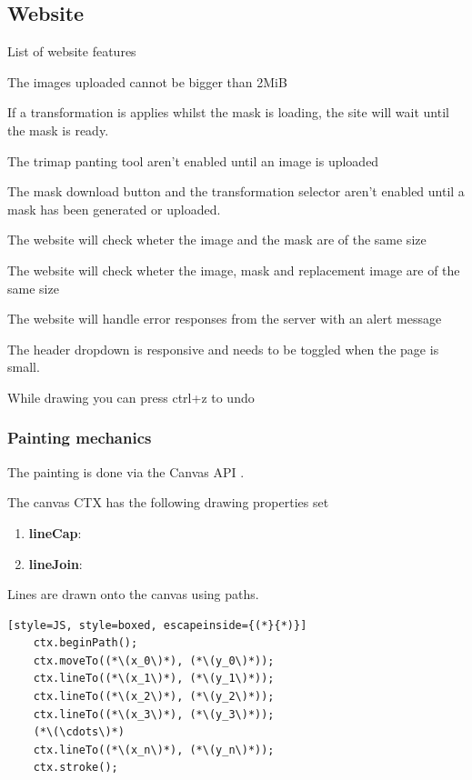 \documentclass[a4paper]{article}
\begin{document}
\subsection{Website}

List of website features

The images uploaded cannot be bigger than 2MiB

If a transformation is applies whilst the mask is loading,
the site will wait until the mask is ready.

The trimap panting tool aren't enabled until an image is uploaded

The mask download button and the transformation
selector aren't enabled until a mask has been generated or uploaded.

The website will check wheter the image and the mask are of the same size

The website will check wheter the image, mask and replacement image are of the same size

The website will handle error responses from the server with an alert message

The header dropdown is responsive and needs to be toggled when the page
is small.

While drawing you can press ctrl+z to undo

\pagebreak

\subsubsection{Painting mechanics}

The painting is done via the Canvas API \cite{canvasapi}.

The canvas CTX has the following drawing properties set
\begin{enumerate}
    \item \textbf{lineCap}: 
    \item \textbf{lineJoin}: 
\end{enumerate}

Lines are drawn onto the canvas using paths.
\begin{lstlisting}[style=JS, style=boxed, escapeinside={(*}{*)}]
    ctx.beginPath();
    ctx.moveTo((*\(x_0\)*), (*\(y_0\)*));
    ctx.lineTo((*\(x_1\)*), (*\(y_1\)*));
    ctx.lineTo((*\(x_2\)*), (*\(y_2\)*));
    ctx.lineTo((*\(x_3\)*), (*\(y_3\)*));
    (*\(\cdots\)*)
    ctx.lineTo((*\(x_n\)*), (*\(y_n\)*));
    ctx.stroke();
\end{lstlisting}
\end{document}
